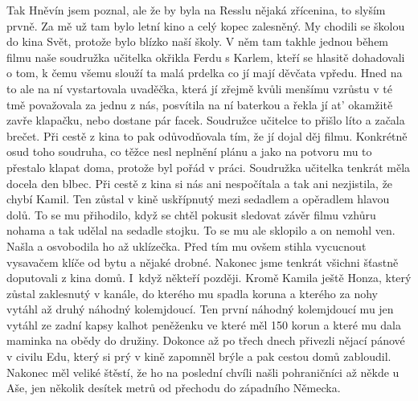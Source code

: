 
Tak Hněvín jsem poznal, ale že by byla na Resslu nějaká zřícenina, to
slyším prvně. Za mě už tam bylo letní kino a celý kopec zalesněný. My
chodili se školou do kina Svět, protože bylo blízko naší školy. V něm
tam takhle jednou během filmu naše soudružka učitelka okřikla Ferdu s
Karlem, kteří se hlasitě dohadovali o tom, k čemu všemu slouží ta malá
prdelka co jí mají děvčata vpředu. Hned na to ale na ní vystartovala
uvaděčka, která jí zřejmě kvůli menšímu vzrůstu v té tmě považovala za
jednu z nás, posvítila na ní baterkou a řekla jí at' okamžitě zavře
klapačku, nebo dostane pár facek. Soudružce učitelce to přišlo líto a
začala brečet. Při cestě z kina to pak odůvodňovala tím, že jí dojal
děj filmu. Konkrétně osud toho soudruha, co těžce nesl neplnění plánu
a jako na potvoru mu to přestalo klapat doma, protože byl pořád v
práci. Soudružka učitelka tenkrát měla docela den blbec. Při cestě z
kina si nás ani nespočítala a tak ani nezjistila, že chybí Kamil. Ten
zůstal v kině uskřípnutý mezi sedadlem a opěradlem hlavou dolů. To se
mu přihodilo, když se chtěl pokusit sledovat závěr filmu vzhůru nohama
a tak udělal na sedadle stojku. To se mu ale sklopilo a on nemohl ven.
Našla a osvobodila ho až uklízečka. Před tím mu ovšem stihla vycucnout
vysavačem klíče od bytu a nějaké drobné. Nakonec jsme tenkrát všichni
šťastně doputovali z kina domů. I~když někteří později. Kromě Kamila
ještě Honza, který zůstal zaklesnutý v kanále, do kterého mu spadla
koruna a kterého za nohy vytáhl až druhý náhodný kolemjdoucí. Ten
první náhodný kolemjdoucí mu jen vytáhl ze zadní kapsy kalhot
peněženku ve které měl 150 korun a které mu dala maminka na obědy do
družiny. Dokonce až po třech dnech přivezli nějací pánové v civilu
Edu, který si prý v kině zapomněl brýle a pak cestou domů zabloudil.
Nakonec měl veliké štěstí, že ho na poslední chvíli našli pohraničníci
až někde u Aše, jen několik desítek metrů od přechodu do západního
Německa.
